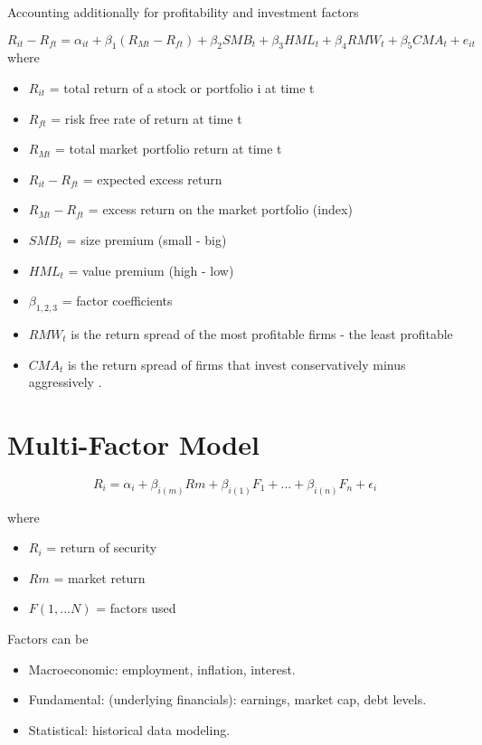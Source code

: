 \documentclass[
]{book}
\providecommand{\tightlist}{%
  \setlength{\itemsep}{0pt}\setlength{\parskip}{0pt}}
\begin{document}
\citep{Fama_2015} Accounting additionally for profitability and investment factors

\[
R_{it} - R_{ft} = \alpha_{it} + \beta_1 (R_{Mt} - R_{ft}) + \beta_2 SMB_t + \beta_3 HML_t + \beta_4 RMW_t + \beta_5 CMA_t + e_{it}
\] where

\begin{itemize}
\tightlist
\item
  \(R_{it}\) = total return of a stock or portfolio i at time t
\item
  \(R_{ft}\) = risk free rate of return at time t
\item
  \(R_{Mt}\) = total market portfolio return at time t
\item
  \(R_{it} - R_{ft}\) = expected excess return
\item
  \(R_{Mt} - R_{ft}\) = excess return on the market portfolio (index)
\item
  \(SMB_t\) = size premium (small - big)
\item
  \(HML_t\) = value premium (high - low)
\item
  \(\beta_{1,2,3}\) = factor coefficients
\item
  \(RMW_t\) is the return spread of the most profitable firms - the least profitable
\item
  \(CMA_t\) is the return spread of firms that invest conservatively minus aggressively .
\end{itemize}

\hypertarget{multi-factor-model}{%
\section{Multi-Factor Model}\label{multi-factor-model}}

\[
R_i = \alpha_i + \beta_{i(m)} Rm + \beta_{i(1)} F_1 + ...+ \beta_{i(n)} F_n + \epsilon_i
\]

where

\begin{itemize}
\tightlist
\item
  \(R_i\) = return of security
\item
  \(Rm\) = market return
\item
  \(F(1,...N)\) = factors used
\end{itemize}

Factors can be

\begin{itemize}
\tightlist
\item
  Macroeconomic: employment, inflation, interest.
\item
  Fundamental: (underlying financials): earnings, market cap, debt levels.
\item
  Statistical: historical data modeling.
\end{itemize}
\end{document}
